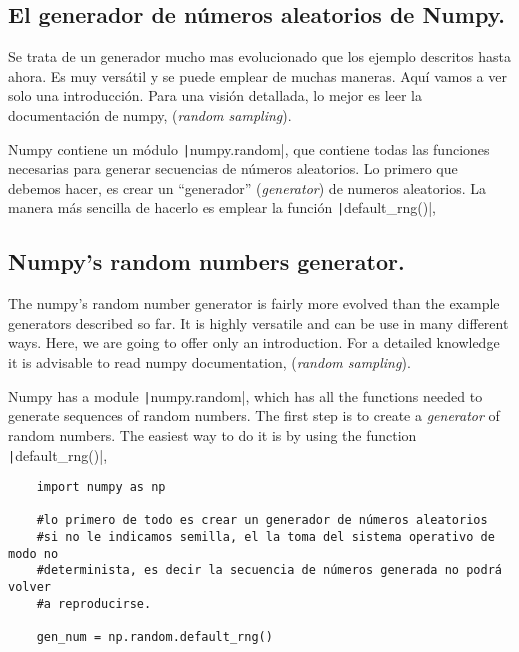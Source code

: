 \begin{paracol}{2}
\subsection{El generador de números aleatorios de Numpy.}\label{rand} Se trata de un generador mucho mas evolucionado que los ejemplo descritos hasta ahora. Es muy versátil y se puede emplear de muchas maneras. Aquí vamos a ver solo una introducción. Para una visión detallada, lo mejor es leer la documentación de numpy, (\emph{random sampling}).

Numpy contiene un módulo  \texttt|numpy.random|, que contiene todas las funciones necesarias para generar secuencias de números aleatorios. Lo primero que debemos hacer, es crear un ``generador'' (\emph{generator}) de numeros aleatorios. La manera más sencilla de hacerlo es emplear la función \texttt|default_rng()|,

\switchcolumn
\subsection{Numpy's random numbers generator.} The numpy's random number generator is fairly more evolved than the example generators described so far. It is highly versatile and can be use in many different ways. Here, we are going to offer only an introduction. For a detailed knowledge it is advisable to read numpy documentation, (\emph{random sampling}).

Numpy has a module \texttt|numpy.random|, which has all the functions needed to generate sequences of random numbers. The first step is to create a \emph{generator} of random numbers. The easiest way to do it is by using the function \texttt|default_rng()|,  
\end{paracol}
\begin{verbatim}
	import numpy as np
	
	#lo primero de todo es crear un generador de números aleatorios
	#si no le indicamos semilla, el la toma del sistema operativo de modo no
	#determinista, es decir la secuencia de números generada no podrá volver 
	#a reproducirse.
	
	gen_num = np.random.default_rng()
\end{verbatim}
 

